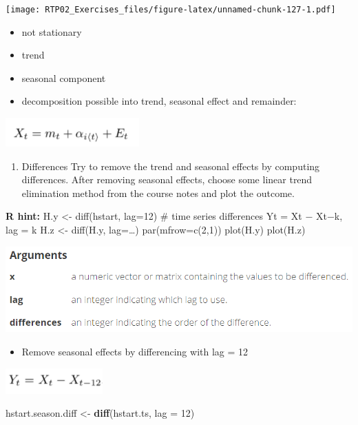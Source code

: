 \documentclass[
]{article}
\newenvironment{Shaded}{\begin{snugshade}}{\end{snugshade}}
\newcommand{\DataTypeTok}[1]{\textcolor[rgb]{0.13,0.29,0.53}{#1}}
\newcommand{\DecValTok}[1]{\textcolor[rgb]{0.00,0.00,0.81}{#1}}
\newcommand{\KeywordTok}[1]{\textcolor[rgb]{0.13,0.29,0.53}{\textbf{#1}}}
\newcommand{\NormalTok}[1]{#1}
\newcommand{\StringTok}[1]{\textcolor[rgb]{0.31,0.60,0.02}{#1}}
\providecommand{\tightlist}{%
  \setlength{\itemsep}{0pt}\setlength{\parskip}{0pt}}
\begin{document}
\texttt{[image: RTP02\_Exercises\_files/figure-latex/unnamed-chunk-127-1.pdf]}

\begin{itemize}
\tightlist
\item
  not stationary
\item
  trend
\item
  seasonal component
\item
  decomposition possible into trend, seasonal effect and remainder:
\end{itemize}

\includegraphics[width=0.3\linewidth]{Ex1.2a}

\begin{enumerate}
\def\labelenumi{\alph{enumi})}
\setcounter{enumi}{1}
\tightlist
\item
  Differences Try to remove the trend and seasonal effects by computing
  differences. After removing seasonal effects, choose some linear trend
  elimination method from the course notes and plot the outcome.
\end{enumerate}

\textbf{R hint:} H.y \textless- diff(hstart, lag=12) \# time series
differences Yt = Xt − Xt−k, lag = k H.z \textless- diff(H.y, lag=\ldots)
par(mfrow=c(2,1)) plot(H.y) plot(H.z)

\includegraphics[width=0.7\linewidth]{diff}

\begin{itemize}
\tightlist
\item
  Remove seasonal effects by differencing with lag = 12
\end{itemize}

\includegraphics[width=0.3\linewidth]{Ex1.2b1}

\begin{Shaded}
\begin{Highlighting}[]
\NormalTok{hstart.season.diff <-}\StringTok{ }\KeywordTok{diff}\NormalTok{(hstart.ts, }\DataTypeTok{lag =} \DecValTok{12}\NormalTok{)}
\end{Highlighting}
\end{Shaded}
\end{document}
